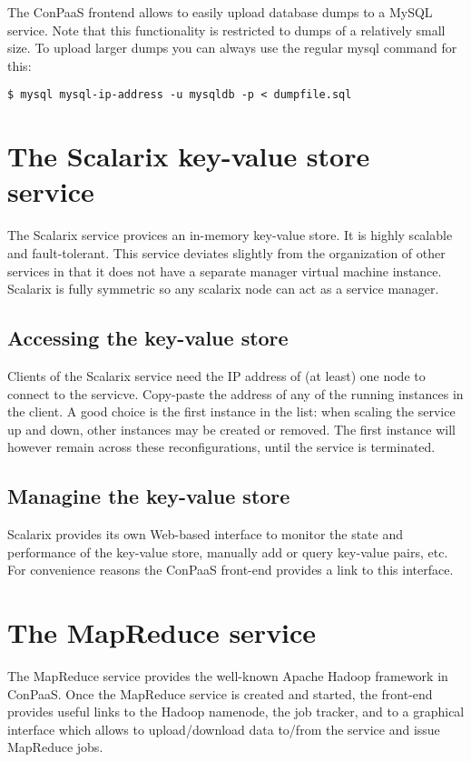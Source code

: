 \documentclass[10pt]{article}
\begin{document}
The ConPaaS frontend allows to easily upload database dumps to a MySQL service. Note that this functionality is restricted to dumps of a relatively small size. To upload larger dumps you can always use the regular mysql command for this:
\begin{verbatim}
$ mysql mysql-ip-address -u mysqldb -p < dumpfile.sql
\end{verbatim}

\section{The Scalarix key-value store service}

The Scalarix service provices an in-memory key-value store. It is
highly scalable and fault-tolerant. This service deviates slightly
from the organization of other services in that it does not have a
separate manager virtual machine instance. Scalarix is fully symmetric
so any scalarix node can act as a service manager.

\subsection{Accessing the key-value store}

Clients of the Scalarix service need the IP address of (at least) one
node to connect to the servicve. Copy-paste the address of any of the
running instances in the client. A good choice is the first instance
in the list: when scaling the service up and down, other instances may
be created or removed. The first instance will however remain across
these reconfigurations, until the service is terminated.



\subsection{Managine the key-value store}

Scalarix provides its own Web-based interface to monitor the state and
performance of the key-value store, manually add or query key-value
pairs, etc. For convenience reasons the ConPaaS front-end provides a
link to this interface.

\section{The MapReduce service}

The MapReduce service provides the well-known Apache Hadoop framework
in ConPaaS. Once the MapReduce service is created and started, the
front-end provides useful links to the Hadoop namenode, the job
tracker, and to a graphical interface which allows to upload/download
data to/from the service and issue MapReduce jobs.
\end{document}
